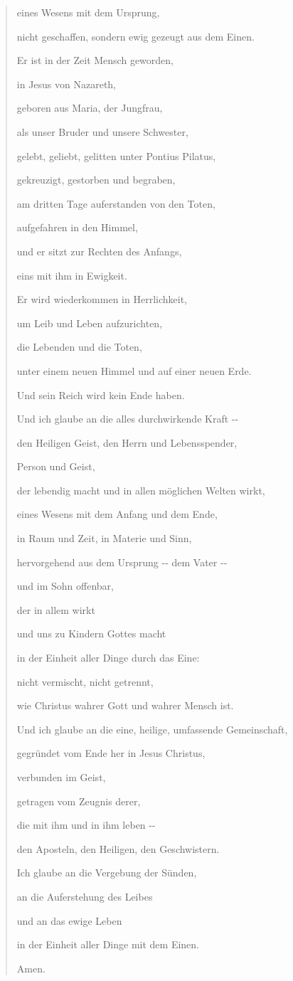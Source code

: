 \documentclass[
  ngerman,
]{article}
\begin{document}
\begin{quote}
eines Wesens mit dem Ursprung,

nicht geschaffen, sondern ewig gezeugt aus dem Einen.

Er ist in der Zeit Mensch geworden,

in Jesus von Nazareth,

geboren aus Maria, der Jungfrau,

als unser Bruder und unsere Schwester,

gelebt, geliebt, gelitten unter Pontius Pilatus,

gekreuzigt, gestorben und begraben,

am dritten Tage auferstanden von den Toten,

aufgefahren in den Himmel,

und er sitzt zur Rechten des Anfangs,

eins mit ihm in Ewigkeit.

Er wird wiederkommen in Herrlichkeit,

um Leib und Leben aufzurichten,

die Lebenden und die Toten,

unter einem neuen Himmel und auf einer neuen Erde.

Und sein Reich wird kein Ende haben.

Und ich glaube an die alles durchwirkende Kraft -\/-

den Heiligen Geist, den Herrn und Lebensspender,

Person und Geist,

der lebendig macht und in allen möglichen Welten wirkt,

eines Wesens mit dem Anfang und dem Ende,

in Raum und Zeit, in Materie und Sinn,

hervorgehend aus dem Ursprung -\/- dem Vater -\/-

und im Sohn offenbar,

der in allem wirkt

und uns zu Kindern Gottes macht

in der Einheit aller Dinge durch das Eine:

nicht vermischt, nicht getrennt,

wie Christus wahrer Gott und wahrer Mensch ist.

Und ich glaube an die eine, heilige, umfassende Gemeinschaft,

gegründet vom Ende her in Jesus Christus,

verbunden im Geist,

getragen vom Zeugnis derer,

die mit ihm und in ihm leben -\/-

den Aposteln, den Heiligen, den Geschwistern.

Ich glaube an die Vergebung der Sünden,

an die Auferstehung des Leibes

und an das ewige Leben

in der Einheit aller Dinge mit dem Einen.

Amen.
\end{quote}
\end{document}
